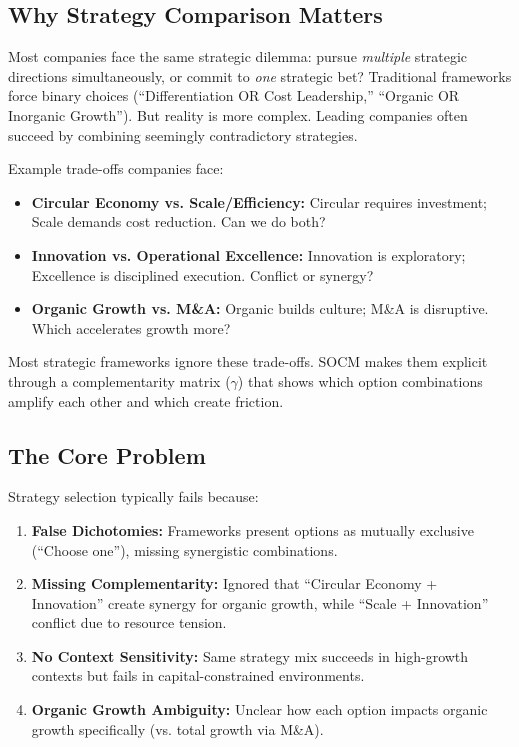 \subsection{Why Strategy Comparison Matters}

Most companies face the same strategic dilemma: pursue \textit{multiple} strategic directions simultaneously, or commit to \textit{one} strategic bet? Traditional frameworks force binary choices (``Differentiation OR Cost Leadership,'' ``Organic OR Inorganic Growth''). But reality is more complex. Leading companies often succeed by combining seemingly contradictory strategies.

Example trade-offs companies face:
\begin{itemize}
    \item \textbf{Circular Economy vs. Scale/Efficiency:} Circular requires investment; Scale demands cost reduction. Can we do both?
    \item \textbf{Innovation vs. Operational Excellence:} Innovation is exploratory; Excellence is disciplined execution. Conflict or synergy?
    \item \textbf{Organic Growth vs. M\&A:} Organic builds culture; M\&A is disruptive. Which accelerates growth more?
\end{itemize}

Most strategic frameworks ignore these trade-offs. SOCM makes them explicit through a complementarity matrix ($\gamma$) that shows which option combinations amplify each other and which create friction.

\subsection{The Core Problem}

Strategy selection typically fails because:

\begin{enumerate}
    \item \textbf{False Dichotomies:} Frameworks present options as mutually exclusive (``Choose one''), missing synergistic combinations.

    \item \textbf{Missing Complementarity:} Ignored that ``Circular Economy + Innovation'' create synergy for organic growth, while ``Scale + Innovation'' conflict due to resource tension.

    \item \textbf{No Context Sensitivity:} Same strategy mix succeeds in high-growth contexts but fails in capital-constrained environments.

    \item \textbf{Organic Growth Ambiguity:} Unclear how each option impacts organic growth specifically (vs. total growth via M\&A).
\end{enumerate}

